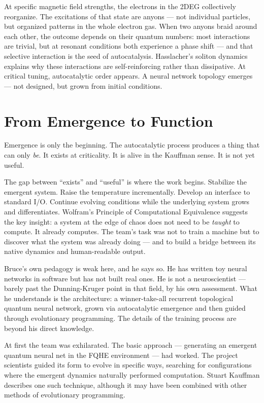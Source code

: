 At specific magnetic field strengths, the electrons in the 2DEG collectively reorganize. The excitations of that state are anyons --- not individual particles, but organized patterns in the whole electron gas. When two anyons braid around each other, the outcome depends on their quantum numbers: most interactions are trivial, but at resonant conditions both experience a phase shift --- and that selective interaction is the seed of autocatalysis. Hasslacher's soliton dynamics explains why these interactions are self-reinforcing rather than dissipative. At critical tuning, autocatalytic order appears. A neural network topology emerges --- not designed, but grown from initial conditions.

\section*{From Emergence to Function}
\label{demo:emergence-to-function}

Emergence is only the beginning. The autocatalytic process produces a thing that can only \textit{be}. It exists at criticality. It is alive in the Kauffman sense. It is not yet useful.

The gap between ``exists'' and ``useful'' is where the work begins. Stabilize the emergent system. Raise the temperature incrementally. Develop an interface to standard I/O\@. Continue evolving conditions while the underlying system grows and differentiates. Wolfram's Principle of Computational Equivalence suggests the key insight: a system at the edge of chaos does not need to be \textit{taught} to compute. It already computes. The team's task was not to train a machine but to discover what the system was already doing --- and to build a bridge between its native dynamics and human-readable output.

Bruce's own pedagogy is weak here, and he says so. He has written toy neural networks in software but has not built real ones. He is not a neuroscientist --- barely past the Dunning-Kruger point in that field, by his own assessment. What he understands is the architecture: a winner-take-all recurrent topological quantum neural network, grown via autocatalytic emergence and then guided through evolutionary programming. The details of the training process are beyond his direct knowledge.

At first the team was exhilarated. The basic approach --- generating an emergent quantum neural net in the FQHE environment --- had worked. The project scientists guided its form to evolve in specific ways, searching for configurations where the emergent dynamics naturally performed computation. Stuart Kauffman describes one such technique, although it may have been combined with other methods of evolutionary programming.

